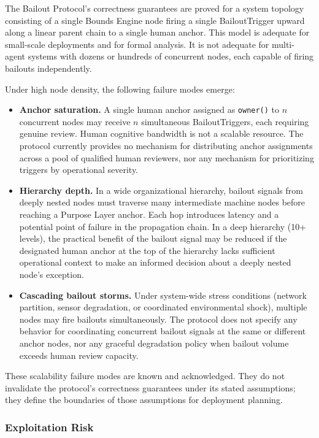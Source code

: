 The Bailout Protocol's correctness guarantees are proved for a system topology consisting of a single Bounds Engine node firing a single BailoutTrigger upward along a linear parent chain to a single human anchor. This model is adequate for small-scale deployments and for formal analysis. It is not adequate for multi-agent systems with dozens or hundreds of concurrent nodes, each capable of firing bailouts independently.

Under high node density, the following failure modes emerge:

\begin{itemize}\setlength\itemsep{0.25em}
\item \textbf{Anchor saturation.} A single human anchor assigned as \texttt{owner()} to $n$ concurrent nodes may receive $n$ simultaneous BailoutTriggers, each requiring genuine review. Human cognitive bandwidth is not a scalable resource. The protocol currently provides no mechanism for distributing anchor assignments across a pool of qualified human reviewers, nor any mechanism for prioritizing triggers by operational severity.
\item \textbf{Hierarchy depth.} In a wide organizational hierarchy, bailout signals from deeply nested nodes must traverse many intermediate machine nodes before reaching a Purpose Layer anchor. Each hop introduces latency and a potential point of failure in the propagation chain. In a deep hierarchy (10+ levels), the practical benefit of the bailout signal may be reduced if the designated human anchor at the top of the hierarchy lacks sufficient operational context to make an informed decision about a deeply nested node's exception.
\item \textbf{Cascading bailout storms.} Under system-wide stress conditions (network partition, sensor degradation, or coordinated environmental shock), multiple nodes may fire bailouts simultaneously. The protocol does not specify any behavior for coordinating concurrent bailout signals at the same or different anchor nodes, nor any graceful degradation policy when bailout volume exceeds human review capacity.
\end{itemize}

These scalability failure modes are known and acknowledged. They do not invalidate the protocol's correctness guarantees under its stated assumptions; they define the boundaries of those assumptions for deployment planning.

\subsubsection{Exploitation Risk}\label{sec:exploitation-risk}

